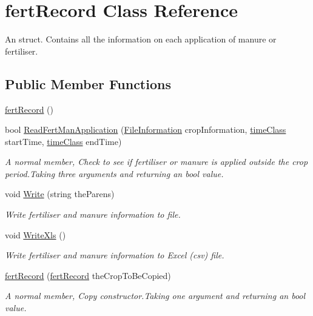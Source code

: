 \hypertarget{classfert_record}{}\section{fert\+Record Class Reference}
\label{classfert_record}


An struct. Contains all the information on each application of manure or fertiliser.  


\subsection*{Public Member Functions}
\begin{DoxyCompactItemize}
\item 
\mbox{\hyperlink{classfert_record_a9214625e78769dae7f0350c12856e0b4}{fert\+Record}} ()
\item 
bool \mbox{\hyperlink{classfert_record_a2eb0f5970facf6762392870c5c6dcb65}{Read\+Fert\+Man\+Application}} (\mbox{\hyperlink{class_file_information}{File\+Information}} crop\+Information, \mbox{\hyperlink{classtime_class}{time\+Class}} start\+Time, \mbox{\hyperlink{classtime_class}{time\+Class}} end\+Time)
\begin{DoxyCompactList}\small\item\em A normal member, Check to see if fertiliser or manure is applied outside the crop period.\+Taking three arguments and returning an bool value. \end{DoxyCompactList}\item 
void \mbox{\hyperlink{classfert_record_a1c2c1943addbb5f6eb5e3fe244fa585b}{Write}} (string the\+Parens)
\begin{DoxyCompactList}\small\item\em Write fertiliser and manure information to file. \end{DoxyCompactList}\item 
void \mbox{\hyperlink{classfert_record_a2874f8deff980009390d942b02d49bc5}{Write\+Xls}} ()
\begin{DoxyCompactList}\small\item\em Write fertiliser and manure information to Excel (csv) file. \end{DoxyCompactList}\item 
\mbox{\hyperlink{classfert_record_aec62ffe21df97c2b28e3c0c37a113d33}{fert\+Record}} (\mbox{\hyperlink{classfert_record}{fert\+Record}} the\+Crop\+To\+Be\+Copied)
\begin{DoxyCompactList}\small\item\em A normal member, Copy constructor.\+Taking one argument and returning an bool value. \end{DoxyCompactList}\item 

\end{DoxyCompactItemize}
